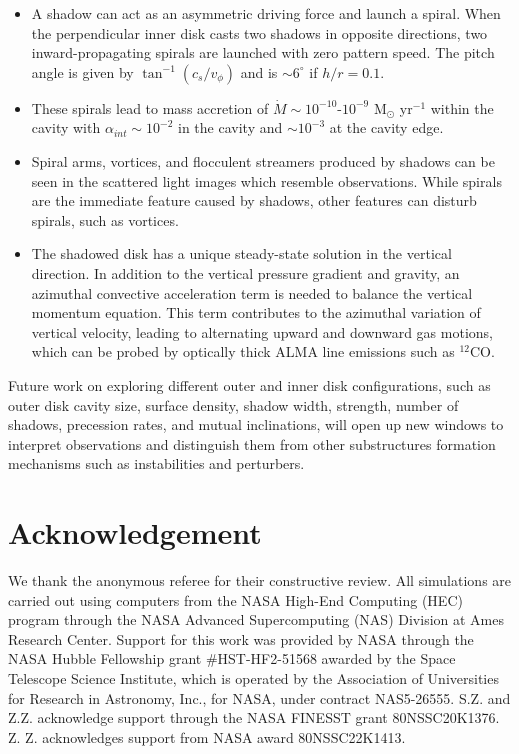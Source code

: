 \documentclass[twocolumn,tighten]{aastex631}
\begin{document}
\begin{itemize}
\item A shadow can act as an asymmetric driving force and launch a spiral. When the perpendicular inner disk casts two shadows in opposite directions, two inward-propagating spirals are launched with zero pattern speed. The pitch angle is given by $\tan^{-1}(c_s/v_\phi)$ and is $\sim 6^{\circ}$ if $h/r = 0.1$.
\item These spirals lead to mass accretion of $\dot{M} \sim 10^{-10}$-$10^{-9}$ M$_\odot$ yr$^{-1}$ within the cavity with $\alpha_{int} \sim 10^{-2}$ in the cavity and $\sim 10^{-3}$ at the cavity edge.
\item Spiral arms, vortices, and flocculent streamers produced by shadows can be seen in the scattered light images which resemble observations. While spirals are the immediate feature caused by shadows, other features can disturb spirals, such as vortices.
\item The shadowed disk has a unique steady-state solution in the vertical direction. In addition to the vertical pressure gradient and gravity, an azimuthal convective acceleration term is needed to balance the vertical momentum equation. This term contributes to the azimuthal variation of vertical velocity, leading to alternating upward and downward gas motions, which can be probed by optically thick ALMA line emissions such as $^{12}$CO. 

\end{itemize}




Future work on exploring different outer and inner disk configurations, such as outer disk cavity size, surface density, shadow width, strength, number of shadows, precession rates, and mutual inclinations, will open up new windows to interpret observations and distinguish them from other substructures formation mechanisms such as instabilities and perturbers.

\section*{Acknowledgement}
We thank the anonymous referee for their constructive review. All simulations are carried out using computers from the NASA High-End Computing (HEC) program through the NASA Advanced Supercomputing (NAS) Division at Ames Research Center. Support for this work was provided by NASA through the NASA Hubble Fellowship grant \#HST-HF2-51568 awarded by the Space Telescope Science Institute, which is operated by the
Association of Universities for Research in Astronomy, Inc., for NASA, under contract NAS5-26555. S.Z. and Z.Z. acknowledge support through the NASA FINESST grant 80NSSC20K1376. Z. Z. acknowledges support from NASA award 80NSSC22K1413.
\end{document}
